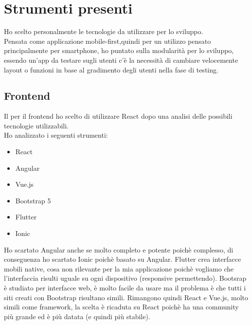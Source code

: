 \vspace{1cm}
\section{Strumenti presenti}
Ho scelto personalmente le tecnologie da utilizzare per lo sviluppo.\\
Pensata come applicazione mobile-first,quindi per un utilizzo pensato principalmente per smartphone, ho puntato sulla modularità per lo sviluppo, essendo un’app da testare sugli utenti c’è la necessità di cambiare velocemente layout o funzioni in base al gradimento degli utenti nella fase di testing. 



\subsection{Frontend}
Il per il frontend ho scelto di utilizzare React dopo una analisi delle possibili tecnologie utilizzabili. \\
Ho analizzato i seguenti strumenti:
\begin{itemize}
\item React
\item Angular
\item Vue.js
\item Bootstrap 5
\item Flutter
\item Ionic
\end{itemize}

Ho scartato Angular anche se molto completo e potente poichè  complesso, di conseguenza ho scartato Ionic poichè basato su Angular. Flutter crea interfacce mobili native, cosa non rilevante per la mia applicazione poichè vogliamo che l'interfaccia risulti uguale su ogni dispositivo (responsive permettendo). Bootsrap è studiato per interfacce web, è molto facile da usare ma il problema è che tutti i siti creati con Bootstrap risultano simili. Rimangono quindi React e Vue.js, molto simili come framework, la scelta è ricaduta su React poichè ha una community più grande ed è più datata (e quindi più stabile).

